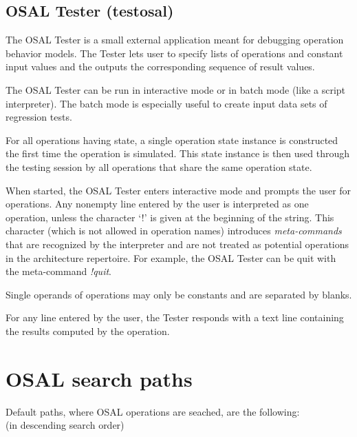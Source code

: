 \documentclass[twoside]{tceusermanual}
\begin{document}
\subsection{OSAL Tester (testosal)}
\label{sec:testosal}

The OSAL Tester is a small external application meant for debugging 
operation behavior models.  The Tester lets user to specify lists of
operations and constant input values and the outputs the corresponding sequence
of result values.

The OSAL Tester can be run in interactive mode or in batch mode (like a
script interpreter).  The batch mode is especially useful to create input
data sets of regression tests.

For all operations having state, a single operation state instance is
constructed the first time the operation is simulated. This state instance
is then used through the testing session by all operations that share the
same operation state.

When started, the OSAL Tester enters interactive mode and prompts the user
for operations. Any nonempty line entered by the user is interpreted as one
operation, unless the character `!' is given at the beginning of the string.
This character (which is not allowed in operation names) introduces
\emph{meta-commands} that are recognized by the interpreter and are not
treated as potential operations in the architecture repertoire. For example, the
OSAL Tester can be quit with the meta-command \textit{!quit}.

Single operands of operations may only be constants and are separated by
blanks.

For any line entered by the user, the Tester responds with a text line
containing the results computed by the operation.

\section{OSAL search paths}
\label{sec:osalpaths}

Default paths, where OSAL operations are seached, are the following: \\
(in descending search order)
\end{document}
